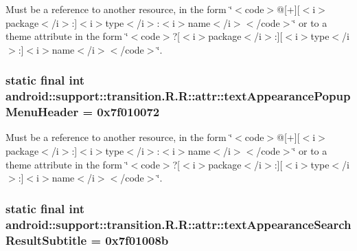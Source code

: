 Must be a reference to another resource, in the form \char`\"{}$<$code$>$@\mbox{[}+\mbox{]}\mbox{[}$<$i$>$package$<$/i$>$:\mbox{]}$<$i$>$type$<$/i$>$:$<$i$>$name$<$/i$>$$<$/code$>$\char`\"{} or to a theme attribute in the form \char`\"{}$<$code$>$?\mbox{[}$<$i$>$package$<$/i$>$:\mbox{]}\mbox{[}$<$i$>$type$<$/i$>$:\mbox{]}$<$i$>$name$<$/i$>$$<$/code$>$\char`\"{}. \hypertarget{classandroid_1_1support_1_1transition_1_1_r_1_1attr_73eaa4855846cb748386c1fe78f8741a}{
\subsubsection[{textAppearancePopupMenuHeader}]{\setlength{\rightskip}{0pt plus 5cm}static final int android::support::transition.R.R::attr::textAppearancePopupMenuHeader = 0x7f010072}}
\label{classandroid_1_1support_1_1transition_1_1_r_1_1attr_73eaa4855846cb748386c1fe78f8741a}


Must be a reference to another resource, in the form \char`\"{}$<$code$>$@\mbox{[}+\mbox{]}\mbox{[}$<$i$>$package$<$/i$>$:\mbox{]}$<$i$>$type$<$/i$>$:$<$i$>$name$<$/i$>$$<$/code$>$\char`\"{} or to a theme attribute in the form \char`\"{}$<$code$>$?\mbox{[}$<$i$>$package$<$/i$>$:\mbox{]}\mbox{[}$<$i$>$type$<$/i$>$:\mbox{]}$<$i$>$name$<$/i$>$$<$/code$>$\char`\"{}. \hypertarget{classandroid_1_1support_1_1transition_1_1_r_1_1attr_14bf9b2c30a6193d06c0980226cf719c}{
\subsubsection[{textAppearanceSearchResultSubtitle}]{\setlength{\rightskip}{0pt plus 5cm}static final int android::support::transition.R.R::attr::textAppearanceSearchResultSubtitle = 0x7f01008b}}
\label{classandroid_1_1support_1_1transition_1_1_r_1_1attr_14bf9b2c30a6193d06c0980226cf719c}


